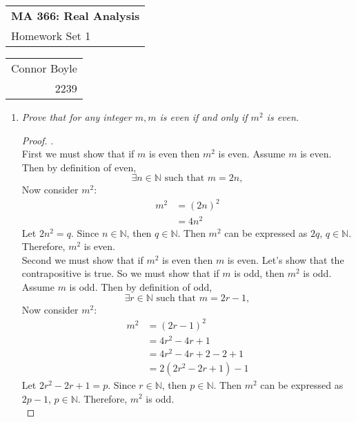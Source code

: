 \documentclass{amsart}
\def\name{Connor Boyle} %
\def\CM{2239} %
\def\hwnum{1} %
\begin{document}
\noindent
\thispagestyle{firststyle}
\begin{tabular}{l}
{\LARGE \textbf{MA 366: Real Analysis} }\\
{\Large Homework Set \hwnum}
\end{tabular} \hfill \begin{tabular}{r}
                        \name \\
                        \CM
                        \end{tabular}

\noindent \hrulefill

\begin{enumerate}[1.]
\item \emph{Prove that for any integer $m, m$ is even if and only if $m^2$ is even.}
\begin{proof} .\\

First we must show that if $m$ is even then $m^2$ is even.
Assume $m$ is even. Then by definition of even, 
\[\exists n\in\mathbb{N} \text{ such that } m = 2n, \]
Now consider $m^2$:
\begin{align*} 
    m^2 &= (2n)^2 \\
    &= 4n^2
\end{align*}
Let $2n^2 = q$. Since $n\in\mathbb{N}$, then $q\in\mathbb{N}$. 
Then $m^2$ can be expressed as $2q$, $q\in\mathbb{N}$. Therefore, $m^2$ is even. \\

Second we must show that if $m^2$ is even then $m$ is even.
Let's show that the contrapositive is true.
So we must show that if $m$ is odd, then $m^2$ is odd.
Assume $m$ is odd. Then by definition of odd, 
\[\exists r\in\mathbb{N} \text{ such that } m = 2r - 1, \]
Now consider $m^2$:
\begin{align*}
    m^2 &= (2r - 1)^2 \\
    &= 4r^2 - 4r + 1 \\
    &= 4r^2 - 4r + 2 - 2 + 1 \\
    &= 2(2r^2 -2r + 1) - 1
\end{align*}
Let $2r^2 - 2r + 1 = p$. Since $r\in\mathbb{N}$, then $p\in\mathbb{N}$.
Then $m^2$ can be expressed as $2p - 1$, $p\in\mathbb{N}$. Therefore, $m^2$ is odd. \\
\end{proof}


\end{enumerate}
\end{document}
